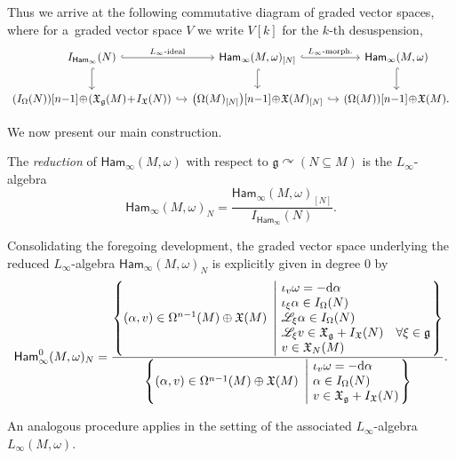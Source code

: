 \documentclass[10pt,a4paper]{amsart}
\numberwithin{equation}{section}
\newcommand{\g}{\mathfrak{g}}
\newcommand{\Ham}{\mathsf{Ham}}
\newcommand{\fgmodule}{\mathfrak{X}_{\g}}
\newcommand{\vanvf}{I_{\mathfrak{X}}(N)}%
\renewcommand{\L}{\mathscr{L}}
\newcommand{\X}{\mathfrak{X}}
\renewcommand{\subset}{\subseteq}
\renewcommand{\d}{\mathrm{d}}
\begin{document}
Thus we arrive at the following commutative diagram of graded vector spaces, where for a~graded vector space $V$ we write $V[k]$ for the $k$-th desuspension,
\[
	\begin{tikzcd}[column sep =1.0em]
		I_{\Ham_\infty}(N) \ar[r,hook,"L_\infty\text{-ideal}"] \ar[d,hook]&
		\Ham_\infty(M,\omega)_{[N]} \ar[r,hook,"L_\infty\text{-morph.}"] \ar[d,hook] &
		\Ham_\infty(M,\omega) \ar[d,hook]
		\\
		 (I_\Omega(N) ){[n{-}1]}\!\oplus\! (\fgmodule(M)\!+\!\vanvf ) \ar[r,hook]&
		 \bigl(\Omega(M)_{[N]} \bigr){[n{-}1]}\!\oplus\! \X(M)_{[N]} \ar[r,hook]&
		 (\Omega(M) ){[n{-}1]}\!\oplus\! \X(M).
	\end{tikzcd}
\]

We now present our main construction.

\begin{Definition}\label{def:LinftyReductions}
	The \emph{reduction} of $\Ham_\infty(M,\omega)$ with respect to $\g\curvearrowright (N\subset M)$ is the $L_\infty$-algebra
	\[
		\Ham_\infty(M,\omega)_N = \frac{\Ham_\infty(M,\omega)_{[N]}}{I_{\Ham_\infty}(N)}.
	\]
\end{Definition}

Consolidating the foregoing development, the graded vector space underlying the reduced $L_\infty$-algebra $\Ham_\infty(M,\omega)_N$ is explicitly given in degree $0$
by
\[
	\Ham_\infty^0(M,\omega)_N =
	\frac{
		\left\lbrace
			(\alpha,v) \in \Omega^{n{-}1}(M) \oplus\X(M)
		~\left\vert~
			\begin{array}{@{}l@{}}
				\iota_v \omega = -\d \alpha
				\\
				\iota_\xi \alpha \in I_{\Omega}(N)
				\\
				\L_\xi\alpha \in I_{\Omega}(N)
				\\
				\L_\xi v \in \fgmodule +\vanvf
				\quad\forall \xi \in \g
				\\
				v \in \X_N(M)
			\end{array}
		\right.
		\right\rbrace
	}{
		\left\lbrace
			(\alpha,v) \in \Omega^{n{-}1}(M)\oplus\X(M)
		~\left\vert~
			\begin{array}{@{}l@{}}
				\iota_v \omega = -\d \alpha
				\\
				\alpha \in I_{\Omega}(N)
				\\
				v \in \fgmodule +\vanvf
			\end{array}
		\right.
		\right\rbrace
	}.
\]

An analogous procedure applies in the setting of the associated $L_\infty$-algebra $L_\infty(M,\omega)$.
\end{document}
